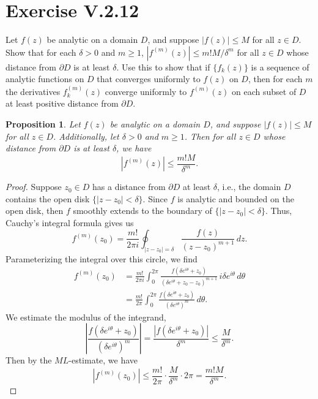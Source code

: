\documentclass[12pt]{article}
\newenvironment{problem}
    {\begin{lrbox}{\mybox}\begin{minipage}{0.98\textwidth}}
    {\end{minipage}\end{lrbox}\framebox[\textwidth]{\usebox{\mybox}}}
\newtheorem{proposition}{Proposition}
\newcommand{\bd}{\partial}
\begin{document}
\newpage
\section{Exercise V.2.12}
\begin{problem}
    Let $f(z)$ be analytic on a domain $D$, and suppose $|f(z)| \leq M$ for all $z \in D$. Show that for each $\delta > 0$ and $m \geq 1$, $|f^{(m)}(z)| \leq m! M / \delta^m$ for all $z \in D$ whose distance from $\bd D$ is at least $\delta$. Use this to show that if $\{f_k(z)\}$ is a sequence of analytic functions on $D$ that converges uniformly to $f(z)$ on $D$, then for each $m$ the derivatives $f_k^{(m)}(z)$ converge uniformly to $f^{(m)}(z)$ on each subset of $D$ at least positive distance from $\bd D$.
\end{problem}

\begin{proposition}
    Let $f(z)$ be analytic on a domain $D$, and suppose $|f(z)| \leq M$ for all $z \in D$. Additionally, let $\delta > 0$ and $m \geq 1$. Then for all $z \in D$ whose distance from $\bd D$ is at least $\delta$, we have
    \[
        \left| f^{(m)}(z) \right| \leq \frac{m!M}{\delta^m}.
    \]
\end{proposition}

\begin{proof}
    Suppose $z_0 \in D$ has a distance from $\bd D$ at least $\delta$, i.e., the domain $D$ contains the open disk $\{|z - z_0| < \delta\}$. Since $f$ is analytic and bounded on the open disk, then $f$ smoothly extends to the boundary of $\{|z - z_0| < \delta\}$. Thus, Cauchy's integral formula gives us
    \[
        f^{(m)}(z_0) = \frac{m!}{2\pi i} \oint_{|z - z_0| = \delta} \frac{f(z)}{(z - z_0)^{m + 1}} \,dz.
    \]
    Parameterizing the integral over this circle, we find
    \begin{align*}
        f^{(m)}(z_0) 
            &= \frac{m!}{2\pi i} \int_0^{2\pi} \frac{f(\delta e^{i\theta} + z_0)}{(\delta e^{i\theta} + z_0 - z_0)^{m + 1}}\, i \delta e^{i\theta} \,d\theta \\[1em]
            &= \frac{m!}{2\pi} \int_0^{2\pi} \frac{f(\delta e^{i\theta} + z_0)}{(\delta e^{i\theta})^m} \,d\theta.
    \end{align*}
    We estimate the modulus of the integrand,
    \[
        \left| \frac{f(\delta e^{i\theta} + z_0)}{(\delta e^{i\theta})^m} \right|
            = \frac{\left| f(\delta e^{i\theta} + z_0) \right|}{\delta^m}
            \leq \frac{M}{\delta^m}.
    \]
    Then by the $ML$-estimate, we have
    \[
        \left| f^{(m)}(z_0) \right|
            \leq \frac{m!}{2\pi} \cdot \frac{M}{\delta^m} \cdot 2\pi
            = \frac{m!M}{\delta^m}.
    \]
    
\end{proof}
\end{document}
